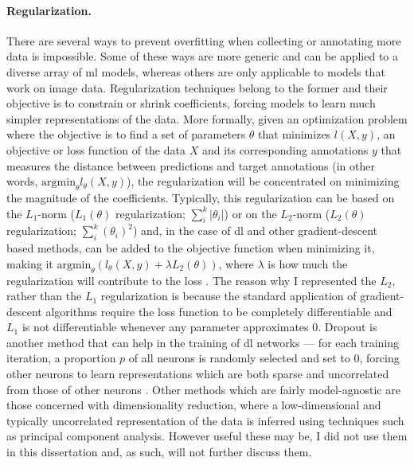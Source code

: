 \paragraph{Regularization.} There are several ways to prevent overfitting when collecting or annotating more data is impossible. Some of these ways are more generic and can be applied to a diverse array of \ac{ml} models, whereas others are only applicable to models that work on image data. Regularization techniques belong to the former and their objective is to constrain or shrink coefficients, forcing models to learn much simpler representations of the data. More formally, given an optimization problem where the objective is to find a set of parameters $\theta$ that minimizes $l(X,y)$, an objective or loss function of the data $X$ and its corresponding annotations $y$ that measures the distance between predictions and target annotations (in other words, $\mathrm{arg min}_{\theta}l_{\theta}(X,y)$), the regularization will be concentrated on minimizing the magnitude of the coefficients. Typically, this regularization can be based on the $L_1$-norm ($L_1(\theta)$ regularization; $\sum_i^k{|\theta_i|}$) or on the $L_2$-norm ($L_2(\theta)$ regularization; $\sum_i^k{(\theta_i)^2}$) and, in the case of \ac{dl} and other gradient-descent based methods, can be added to the objective function when minimizing it, making it $\mathrm{arg min}_{\theta}(l_{\theta}(X,y)+\lambda L_2(\theta))$, where $\lambda$ is how much the regularization will contribute to the loss \cite{James2013-py}. The reason why I represented the $L_2$, rather than the $L_1$ regularization is because the standard application of gradient-descent algorithms require the loss function to be completely differentiable and $L_1$ is not differentiable whenever any parameter approximates $0$. Dropout is another method that can help in the training of \ac{dl} networks --- for each training iteration, a proportion $p$ of all neurons is randomly selected and set to $0$, forcing other neurons to learn representations which are both sparse and uncorrelated from those of other neurons \cite{Srivastava2014a}. Other methods which are fairly model-agnostic are those concerned with dimensionality reduction, where a low-dimensional and typically uncorrelated representation of the data is inferred using techniques such as principal component analysis. However useful these may be, I did not use them in this dissertation and, as such, will not further discuss them.


